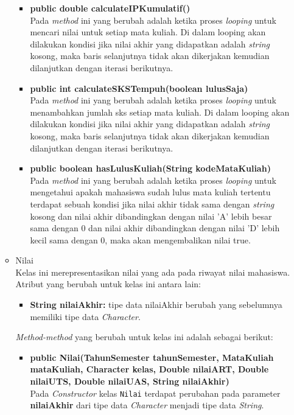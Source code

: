 \begin{enumerate}
\begin{itemize}
\begin{itemize}
					\item \textbf{public double calculateIPKumulatif()}\\
						Pada \textit{method} ini yang berubah adalah ketika proses \textit{looping} untuk mencari nilai untuk setiap mata kuliah. Di dalam looping akan dilakukan kondisi jika nilai akhir yang didapatkan adalah \textit{string} kosong, maka baris selanjutnya tidak akan dikerjakan kemudian dilanjutkan dengan iterasi berikutnya.
					
					\item \textbf{public int calculateSKSTempuh(boolean lulusSaja)}\\
						Pada \textit{method} ini yang berubah adalah ketika proses \textit{looping} untuk menambahkan jumlah sks setiap mata kuliah. Di dalam looping akan dilakukan kondisi jika nilai akhir yang didapatkan adalah \textit{string} kosong, maka baris selanjutnya tidak akan dikerjakan kemudian dilanjutkan dengan iterasi berikutnya.
					
					\item \textbf{public boolean hasLulusKuliah(String kodeMataKuliah)}\\
						Pada \textit{method} ini yang berubah adalah ketika proses \textit{looping} untuk mengetahui apakah mahasiswa sudah lulus mata kuliah tertentu terdapat sebuah kondisi jika nilai akhir tidak sama dengan \textit{string} kosong dan nilai akhir dibandingkan dengan nilai 'A' lebih besar sama dengan 0 dan nilai akhir dibandingkan dengan nilai 'D' lebih kecil sama dengan 0, maka akan mengembalikan nilai true.
		\end{itemize}
			
				\item Nilai\\
				Kelas ini merepresentasikan nilai yang ada pada riwayat nilai mahasiswa. Atribut yang berubah untuk kelas ini antara lain:
				\begin{itemize}
					\item \textbf{String nilaiAkhir:} tipe data nilaiAkhir berubah yang sebelumnya memiliki tipe data \textit{Character}.
				\end{itemize}
			\textit{Method-method} yang berubah untuk kelas ini adalah sebagai berikut:
				\begin{itemize}
					\item \textbf{public Nilai(TahunSemester tahunSemester, MataKuliah mataKuliah, Character kelas, Double nilaiART, Double nilaiUTS, Double nilaiUAS, String nilaiAkhir)}\\
						Pada \textit{Constructor} kelas \texttt{Nilai} terdapat perubahan pada parameter \textbf{nilaiAkhir} dari tipe data \textit{Character} menjadi tipe data \textit{String}.
						

\end{itemize}
\end{itemize}
\end{enumerate}

